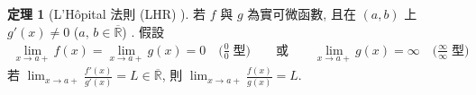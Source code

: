 \documentclass[12pt]{extarticle}
\newcommand{\ds}{\displaystyle}
\theoremstyle{definition}
\newtheorem*{thm}{定理}
\begin{document}

\begin{thm}[L'H\^opital 法則 (LHR) ]
  若 $f$ 與 $g$ 為實可微函數, 且在 $(a, b)$ 上 $g'(x)\ne 0$ ($a,\,b\in\overline{\mathbb{R}}$) . 假設 
  \begin{align*}
    \lim_{x\to a+}f(x) = \lim_{x\to a+}g(x) = 0\quad\Big(\frac{0}{0}\;\text{型}\Big)\qquad\text{或}\qquad\lim_{x\to a+}g(x) = \infty\quad\Big(\frac{\infty}{\infty}\;\text{型}\Big)
  \end{align*}
  若 $\ds\lim_{x\to a+}\frac{f'(x)}{g'(x)} = L\in\overline{\mathbb{R}}$, 則 $\ds\lim_{x\to a+}\frac{f(x)}{g(x)} = L$. 
\end{thm}
\end{document}
